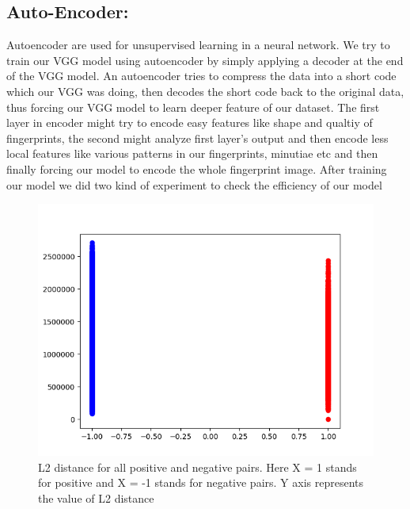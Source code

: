 \subsection {\bf Auto-Encoder:} 
Autoencoder are used for unsupervised learning in a neural network. We try to train our VGG model using autoencoder by simply applying a decoder at the end of the VGG model. An autoencoder tries to compress the data into a short code which our VGG was doing, then decodes the short code back to the original data, thus forcing our VGG model to learn deeper feature of our dataset. The first layer in encoder might try to encode easy features like shape and qualtiy of fingerprints, the second might analyze first layer's output and then encode less local features like various patterns in our fingerprints, minutiae etc and then finally forcing our model to encode the whole fingerprint image. After training our model we did two kind of experiment to check the efficiency of our model
\begin{figure}[htbp]
\centering
\includegraphics[scale=1]{./Chapter4/Figures/AE_norms_pos_neg}
\caption{L2 distance for all positive and negative pairs. Here X = 1 stands for positive and X = -1 stands for negative pairs. Y axis represents the value of L2 distance}
\label{fig:figure7}
\end{figure}
